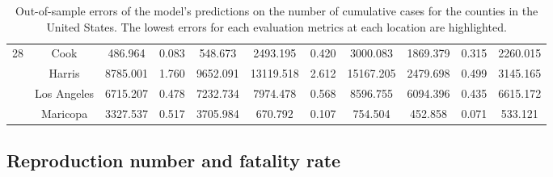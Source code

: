 \begin{landscape}
\begin{table}[!htb]
\begin{tabular}{| c | c | c | c | c | c | c | c | c | c | c |}
        \multirow{4}{*}{28}
            & Cook & 486.964 & 0.083 & 548.673 & 2493.195 & 0.420 & 3000.083 & 1869.379 & 0.315 & 2260.015
            \\ \cline{2-11}
            & Harris & 8785.001 & 1.760 & 9652.091 & 13119.518 & 2.612 & 15167.205 & 2479.698 & 0.499 & 3145.165
            \\ \cline{2-11}
            & Los Angeles & 6715.207 & 0.478 & 7232.734 & 7974.478 & 0.568 & 8596.755 & 6094.396 & 0.435 & 6615.172
            \\ \cline{2-11}
            & Maricopa & 3327.537 & 0.517 & 3705.984 & 670.792 & 0.107 & 754.504 & 452.858 & 0.071 & 533.121
            \\
        \hline
    \end{tabular}
    \caption{Out-of-sample errors of the model's predictions on the number of cumulative cases for the counties in the United States. The lowest errors for each evaluation metrics at each location are highlighted.}
\end{table}
\end{landscape}

\subsection{Reproduction number and fatality rate}


